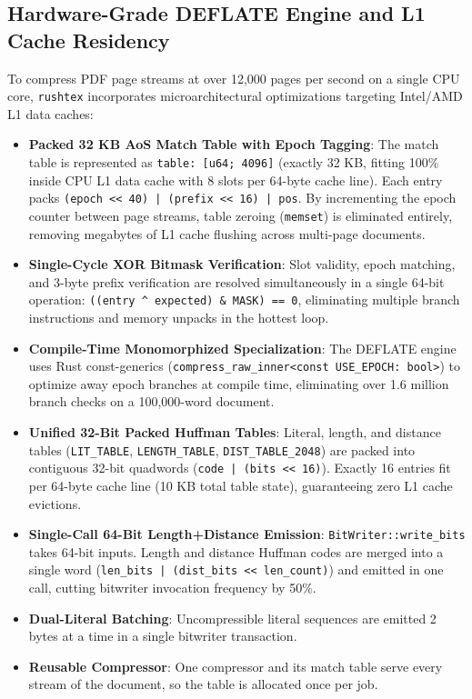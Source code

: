 \documentclass[11pt, a4paper]{article}
\begin{document}
\subsection{Hardware-Grade DEFLATE Engine and L1 Cache Residency}
To compress PDF page streams at over 12,000 pages per second on a single CPU core, \texttt{rushtex} incorporates microarchitectural optimizations targeting Intel/AMD L1 data caches:
\begin{itemize}
\item \textbf{Packed 32 KB AoS Match Table with Epoch Tagging}: The match table is represented as \texttt{table: [u64; 4096]} (exactly 32 KB, fitting 100\% inside CPU L1 data cache with 8 slots per 64-byte cache line). Each entry packs \texttt{(epoch << 40) | (prefix << 16) | pos}. By incrementing the epoch counter between page streams, table zeroing (\texttt{memset}) is eliminated entirely, removing megabytes of L1 cache flushing across multi-page documents.
\item \textbf{Single-Cycle XOR Bitmask Verification}: Slot validity, epoch matching, and 3-byte prefix verification are resolved simultaneously in a single 64-bit operation: \texttt{((entry \^{} expected) \& MASK) == 0}, eliminating multiple branch instructions and memory unpacks in the hottest loop.
\item \textbf{Compile-Time Monomorphized Specialization}: The DEFLATE engine uses Rust const-generics (\texttt{compress\_raw\_inner<const USE\_EPOCH: bool>}) to optimize away epoch branches at compile time, eliminating over 1.6 million branch checks on a 100,000-word document.
\item \textbf{Unified 32-Bit Packed Huffman Tables}: Literal, length, and distance tables (\texttt{LIT\_TABLE}, \texttt{LENGTH\_TABLE}, \texttt{DIST\_TABLE\_2048}) are packed into contiguous 32-bit quadwords (\texttt{code | (bits << 16)}). Exactly 16 entries fit per 64-byte cache line (10 KB total table state), guaranteeing zero L1 cache evictions.
\item \textbf{Single-Call 64-Bit Length+Distance Emission}: \texttt{BitWriter::write\_bits} takes 64-bit inputs. Length and distance Huffman codes are merged into a single word (\texttt{len\_bits | (dist\_bits << len\_count)}) and emitted in one call, cutting bitwriter invocation frequency by 50\%.
\item \textbf{Dual-Literal Batching}: Uncompressible literal sequences are emitted 2 bytes at a time in a single bitwriter transaction.
\item \textbf{Reusable Compressor}: One compressor and its match table serve every stream of the document, so the table is allocated once per job.
\end{itemize}
\end{document}
